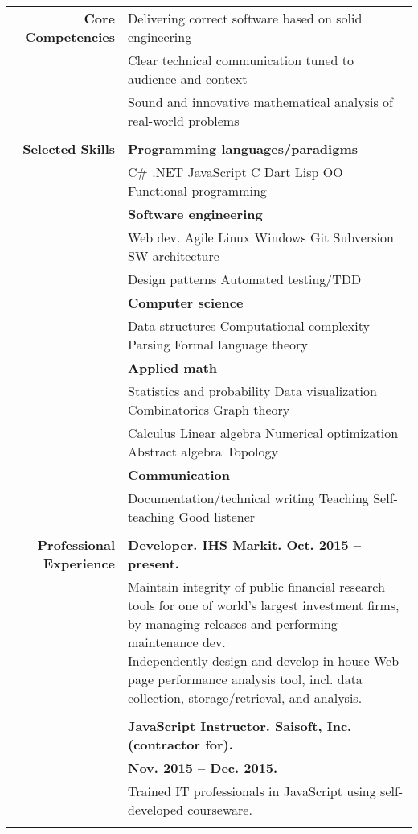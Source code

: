 \documentclass{article}
\newcommand\spc{\hspace{8pt}}
\begin{document}
\bgroup
\begin{tabular}{rl}
  \def\arraystrech{1.5}
  {\bf Core Competencies} & Delivering correct software based on solid engineering \\
   & Clear technical communication tuned to audience and context \\
   & Sound and innovative mathematical analysis of real-world problems \\ \\

  {\bf Selected Skills}  & {\bf Programming languages/paradigms} \\
  & C\# \spc .NET \spc JavaScript \spc C \spc Dart \spc Lisp \spc OO \spc Functional programming \\
  & {\bf Software engineering} \\
  & Web dev. \spc Agile \spc Linux \spc Windows \spc Git \spc Subversion \spc SW architecture \\
 & Design patterns \spc Automated testing/TDD \\
    & {\bf Computer science} \\
  & Data structures \spc Computational complexity \spc Parsing \spc Formal language theory \\
  & {\bf Applied math} \\
  & Statistics and probability \spc Data visualization \spc Combinatorics \spc Graph theory \\
  & Calculus \spc Linear algebra \spc Numerical optimization \spc Abstract algebra \spc Topology \\
  & {\bf Communication} \\
  & Documentation/technical writing \spc Teaching \spc Self-teaching \spc Good listener \\ \\

  {\bf Professional Experience} & {\bf Developer. IHS Markit. Oct. 2015 -- present.} \\
  & \parbox{4.5in}{Maintain integrity of public financial research tools for one of world's largest investment firms, by managing releases and performing maintenance dev. \\ Independently design and develop in-house Web page performance analysis tool, incl. data collection, storage/retrieval, and analysis.} \\ \\

  & {\bf JavaScript Instructor. Saisoft, Inc. (contractor for).} \\ & {\bf Nov. 2015 -- Dec. 2015.} \\
  & \parbox{4.5in}{Trained IT professionals in JavaScript using self-developed courseware.} \\ \\


\end{tabular}
\end{document}
